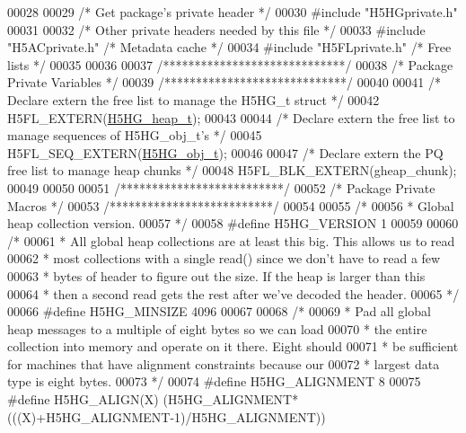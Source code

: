 \begin{DoxyCode}
00028 
00029 \textcolor{comment}{/* Get package's private header */}
00030 \textcolor{preprocessor}{#include "H5HGprivate.h"}
00031 
00032 \textcolor{comment}{/* Other private headers needed by this file */}
00033 \textcolor{preprocessor}{#include "H5ACprivate.h"}    \textcolor{comment}{/* Metadata cache           */}
00034 \textcolor{preprocessor}{#include "H5FLprivate.h"}    \textcolor{comment}{/* Free lists                           */}
00035 
00036 
00037 \textcolor{comment}{/*****************************/}
00038 \textcolor{comment}{/* Package Private Variables */}
00039 \textcolor{comment}{/*****************************/}
00040 
00041 \textcolor{comment}{/* Declare extern the free list to manage the H5HG\_t struct */}
00042 H5FL\_EXTERN(\hyperlink{struct_h5_h_g__heap__t}{H5HG\_heap\_t});
00043 
00044 \textcolor{comment}{/* Declare extern the free list to manage sequences of H5HG\_obj\_t's */}
00045 H5FL\_SEQ\_EXTERN(\hyperlink{struct_h5_h_g__obj__t}{H5HG\_obj\_t});
00046 
00047 \textcolor{comment}{/* Declare extern the PQ free list to manage heap chunks */}
00048 H5FL\_BLK\_EXTERN(gheap\_chunk);
00049 
00050 
00051 \textcolor{comment}{/**************************/}
00052 \textcolor{comment}{/* Package Private Macros */}
00053 \textcolor{comment}{/**************************/}
00054 
00055 \textcolor{comment}{/*}
00056 \textcolor{comment}{ * Global heap collection version.}
00057 \textcolor{comment}{ */}
00058 \textcolor{preprocessor}{#define H5HG\_VERSION    1}
00059 
00060 \textcolor{comment}{/*}
00061 \textcolor{comment}{ * All global heap collections are at least this big.  This allows us to read}
00062 \textcolor{comment}{ * most collections with a single read() since we don't have to read a few}
00063 \textcolor{comment}{ * bytes of header to figure out the size.  If the heap is larger than this}
00064 \textcolor{comment}{ * then a second read gets the rest after we've decoded the header.}
00065 \textcolor{comment}{ */}
00066 \textcolor{preprocessor}{#define H5HG\_MINSIZE    4096}
00067 
00068 \textcolor{comment}{/*}
00069 \textcolor{comment}{ * Pad all global heap messages to a multiple of eight bytes so we can load}
00070 \textcolor{comment}{ * the entire collection into memory and operate on it there.  Eight should}
00071 \textcolor{comment}{ * be sufficient for machines that have alignment constraints because our}
00072 \textcolor{comment}{ * largest data type is eight bytes.}
00073 \textcolor{comment}{ */}
00074 \textcolor{preprocessor}{#define H5HG\_ALIGNMENT  8}
00075 \textcolor{preprocessor}{#define H5HG\_ALIGN(X)   (H5HG\_ALIGNMENT*(((X)+H5HG\_ALIGNMENT-1)/H5HG\_ALIGNMENT))}

\end{DoxyCode}
